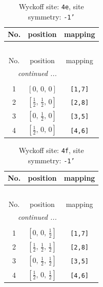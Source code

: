 \documentclass[fleqn,8pt]{jsarticle}
\begin{document}
\begin{longtable}{ccc}
\caption{Wyckoff site: {\tt 4e}, site symmetry: {\tt -1'}}
 \\
 \hline \hline
No. & position & mapping \\ \hline \endfirsthead

\multicolumn{2}{l}{\tablename\ \thetable{}} \\
 \hline \hline
No. & position & mapping \\ \hline \endhead

 \hline \hline
\multicolumn{2}{r}{\footnotesize\it continued ...} \\ \endfoot

 \hline \hline
\multicolumn{2}{r}{} \\ \endlastfoot

1 & $\left[ 0,\, 0,\, 0 \right]$ & {\tt [1,7]} \\ \hline
2 & $\left[ \frac{1}{2},\, \frac{1}{2},\, 0 \right]$ & {\tt [2,8]} \\ \hline
3 & $\left[ 0,\, \frac{1}{2},\, 0 \right]$ & {\tt [3,5]} \\ \hline
4 & $\left[ \frac{1}{2},\, 0,\, 0 \right]$ & {\tt [4,6]} \\
\end{longtable}
\renewcommand{\arraystretch}{1.2}
\begin{longtable}{ccc}
\caption{Wyckoff site: {\tt 4f}, site symmetry: {\tt -1'}}
 \\
 \hline \hline
No. & position & mapping \\ \hline \endfirsthead

\multicolumn{2}{l}{\tablename\ \thetable{}} \\
 \hline \hline
No. & position & mapping \\ \hline \endhead

 \hline \hline
\multicolumn{2}{r}{\footnotesize\it continued ...} \\ \endfoot

 \hline \hline
\multicolumn{2}{r}{} \\ \endlastfoot

1 & $\left[ 0,\, 0,\, \frac{1}{2} \right]$ & {\tt [1,7]} \\ \hline
2 & $\left[ \frac{1}{2},\, \frac{1}{2},\, \frac{1}{2} \right]$ & {\tt [2,8]} \\ \hline
3 & $\left[ 0,\, \frac{1}{2},\, \frac{1}{2} \right]$ & {\tt [3,5]} \\ \hline
4 & $\left[ \frac{1}{2},\, 0,\, \frac{1}{2} \right]$ & {\tt [4,6]} \\
\end{longtable}
\end{document}
